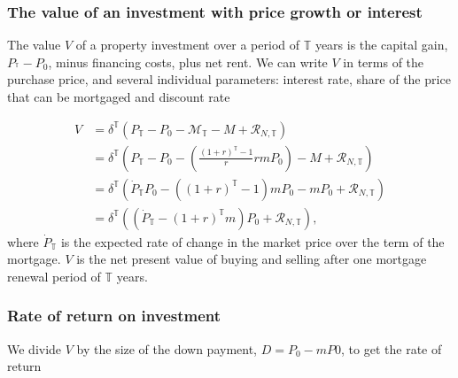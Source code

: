 {\subsubsection{The value of an investment with price growth or interest}
 The value $V$ of a property investment over a period of $\mathbb{T}$ years is  the capital gain, $P_{^\mathbb{T}}-P_{0}$, minus financing costs, plus net rent. %
 We can write $V$ in terms of the purchase price, and several individual parameters: interest  rate, share of the price that can be mortgaged and  discount rate %
 
 \begin{align}
V &= \delta^\mathbb{T}\left( P_\mathbb{T}-P_0-\mathcal{M}_{\mathbb{T}}- M+ \mathcal{R}_{N, \mathbb{T}} \right)      \nonumber\\
&= \delta^\mathbb{T}\left( P_\mathbb{T}-P_0- \left(\frac{(1+r)^\mathbb{T}-1}{r}rmP_0\right)- M+ \mathcal{R}_{N, \mathbb{T}} \right)      \nonumber\\
&= \delta^\mathbb{T} \left(
\dot P_\mathbb{T} P_0 -\left((1+r)^\mathbb{T}-1\right)mP_0-mP_0
 +  \mathcal{R}_{N, \mathbb{T}} \right) 
\label{first_sub}\nonumber\\
  &= \delta^\mathbb{T} \left((\dot P_\mathbb{T} - (1+r)^\mathbb{T}m) P_0 + \mathcal{R}_{N, \mathbb{T}}\right),
\end{align}
where $\dot P_\mathbb{T}$  is the expected rate of change in the market price over the term of the mortgage.
$V$ is the net present value of buying and selling after one mortgage renewal period of $\mathbb{T}$ years. %


\subsubsection{Rate of return on investment}
We divide $V$ by the size of the down payment, $D=P_0-mP0$, to get the  rate of return  

}

